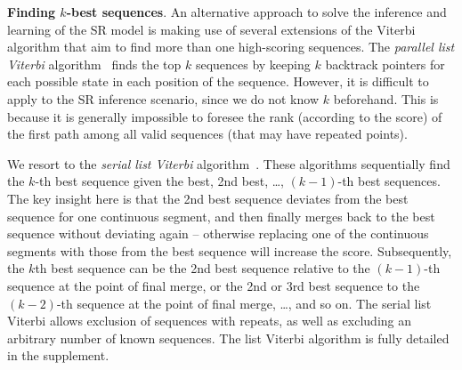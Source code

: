 \textbf{Finding $k$-best sequences}.
An alternative approach to solve the inference and learning of the SR model is making use of 
several extensions of the Viterbi algorithm that aim to find more than one high-scoring sequences.
The \emph{parallel list Viterbi} algorithm~\cite{seshadri1994list} finds the top $k$ sequences
by keeping $k$ backtrack pointers for each possible state in each position of the sequence.
However, it is difficult to apply to the SR inference scenario,
since we do not know $k$ beforehand.
This is because it is generally impossible to foresee
the rank (according to the score) of the first path among all valid sequences (that may have repeated points).

We resort to the \emph{serial list Viterbi} algorithm~\cite{seshadri1994list,nilsson2001sequentially}.
These algorithms sequentially find the $k$-th best sequence given the best, 2nd best, \dots, $(k \!-\! 1)$-th best sequences.
The key insight here is that the 2nd best sequence deviates from the best sequence
for one continuous segment, and then finally merges back to the best sequence without deviating again
-- otherwise replacing one of the continuous segments with those from the best sequence will increase the score.
Subsequently, the $k$th best sequence can be the 2nd best sequence relative to the $(k \!-\! 1)$-th sequence
at the point of final merge, or the 2nd or 3rd best sequence to the $(k \!-\! 2)$-th sequence at the point of final merge, \ldots, and so on.
The serial list Viterbi allows exclusion of sequences with repeats, %
as well as
excluding an arbitrary number of known sequences. %
The list Viterbi algorithm is fully detailed in the supplement.


